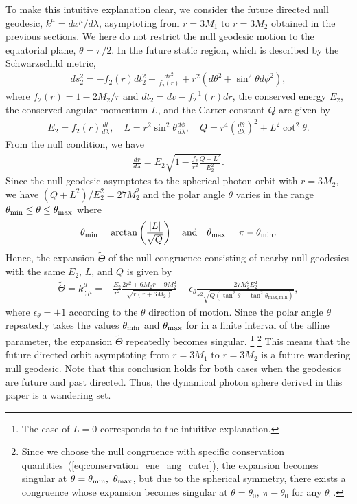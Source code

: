 \documentclass[prd,showpacs,preprintnumbers,groupedaddress,superscriptaddress,nofootinbib,11pt]{revtex4-1} %
\theoremstyle{newplain}
\newcommand{\mr}[1]{\mathrm{#1}}
\begin{document}
To make this intuitive explanation clear, we consider the future directed null geodesic, $k^\mu=dx^\mu/d\lambda$, asymptoting from $r=3M_{1}$ to $r=3M_{2}$ obtained in the previous sections.
We here do not restrict the null geodesic motion to the equatorial plane, $\theta=\pi/2$.
In the future static region, which is described by the Schwarzschild metric,
\begin{align}
  ds_2^2= -f_2(r) dt_2^2 +\frac{dr^2}{f_2(r)}+r^2(d\theta^2+\sin^2 \theta d\phi^2),
\end{align}
where $f_{2}(r)=1-2M_2/r$ and $dt_2= dv-f_2^{-1}(r)dr$,
the conserved energy $E_2$, the conserved angular momentum $L$, and the Carter constant $Q$ are given by
\begin{align}
  E_2=f_2(r)\frac{dt}{d\lambda},
  \quad
  L=r^2 \sin^2 \theta \frac{d\phi}{d\lambda},
  \quad
  Q=r^4 \left(\frac{d\theta}{d\lambda}\right)^2+ L^2 \cot^2 \theta.
  \label{eq:conservation_ene_ang_cater}
\end{align}
From the null condition, we have
\begin{align}
  \frac{d r}{d \lambda}=  E_2 \sqrt{1-\frac{ f_{2}}{r^{2}} \frac{Q+L^2}{E_2^2} }.
\end{align}
Since the null geodesic asymptotes to the spherical photon orbit with $r=3M_{2}$, we have $(Q+L^2)/E_2^2 = 27 M_2^2$ and the polar angle $\theta$ varies in the range $\theta_{\rm min} \le \theta \le \theta_{\rm max}$ where
\begin{align}
  \theta_{\rm min}=\arctan\left( \frac{|L|}{ \sqrt{Q} } \right)
  \quad {\rm and} \quad
  \theta_{\rm max}=\pi -\theta_{\min}.
\end{align}
Hence, the expansion $\tilde{\Theta}$ of the null congruence consisting of nearby null geodesics with the same $E_2$, $L$, and $Q$ is given by
\begin{align}
  \tilde{\Theta}
  =k^{\mu}_{~;\mu}
  =-\frac{ E_2}{r^2} \frac{2r^2 +6M_2r -9M_2^2 }{ \sqrt{r(r+6M_2)}}
  + \epsilon_{\theta} \frac{ 27M_2^2 E_2^2 }{r^2 \sqrt{ Q(\tan^2 \theta - \tan^2 \theta_{\mr{max,min}}) } },
\end{align}
where $\epsilon_{\theta}=\pm 1$ according to the $\theta$ direction of motion.
Since the polar angle $\theta$ repeatedly takes the values $\theta_{\rm min}$ and $\theta_{\rm max}$ for in a finite interval of the affine parameter, the expansion $\tilde{\Theta}$ repeatedly becomes singular.
\footnote{
  The case of $L=0$ corresponds to the intuitive explanation.
}
\footnote{
  Since we choose the null congruence with specific conservation quantities~(\ref{eq:conservation_ene_ang_cater}), the expansion becomes singular at $\theta=\theta_{\rm min},~\theta_{\rm max}$,
  but due to the spherical symmetry, there exists a congruence whose expansion becomes singular at $\theta=\theta_{0},~\pi-\theta_{0}$ for any $\theta_0$.
}
This means that the future directed orbit asymptoting from $r=3M_{1}$ to $r=3M_{2}$ is a future wandering null geodesic.
Note that this conclusion holds for both cases when the geodesics are future and past directed.
Thus, the dynamical photon sphere derived in this paper is a wandering set.
\end{document}
